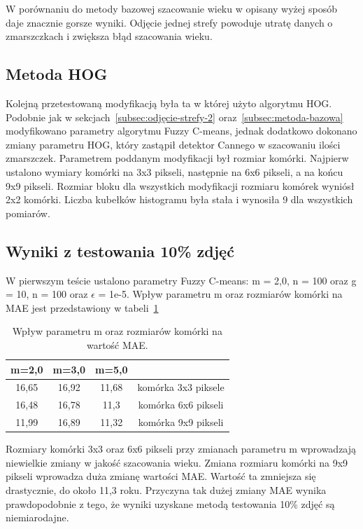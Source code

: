 \documentclass[a4paper,twoside,12pt]{book}
\begin{document}
    W porównaniu do metody bazowej szacowanie wieku w opisany wyżej sposób daje znacznie
    gorsze wyniki. Odjęcie jednej strefy powoduje utratę
    danych o zmarszczkach i zwiększa błąd szacowania wieku.

    \subsection{Metoda HOG}\label{subsec:metoda-hog}
    Kolejną przetestowaną modyfikacją była ta w której użyto algorytmu HOG.
    Podobnie jak w sekcjach~\ref{subsec:odjęcie-strefy-2} oraz~\ref{subsec:metoda-bazowa} modyfikowano parametry
    algorytmu Fuzzy C-means, jednak dodatkowo dokonano zmiany parametru HOG, który zastąpił detektor Cannego w
    szacowaniu ilości zmarszczek.
    Parametrem poddanym modyfikacji był
    rozmiar komórki. Najpierw ustalono wymiary komórki na 3x3 pikseli, następnie na 6x6 pikseli, a na końcu 9x9
    pikseli.
    Rozmiar bloku dla wszystkich modyfikacji rozmiaru komórek wyniósł
    2x2 komórki. Liczba kubełków histogramu była stała i wynosiła 9 dla wszystkich pomiarów.
    \subsection*{Wyniki z testowania 10\% zdjęć}
    W pierwszym teście ustalono parametry Fuzzy C-means: m = 2,0, n = 100 oraz g = 10, n = 100
    oraz $\epsilon$ = 1e-5.
    Wpływ parametru m oraz rozmiarów komórki na MAE jest przedstawiony w tabeli~\ref{tab.hog}
    \begin{table}[]
        \centering
        \caption{Wpływ parametru m oraz rozmiarów komórki na wartość MAE.}
        \begin{tabular}{|c|c|c|c|}
            \hline
            m=2,0 & m=3,0 & m=5,0 &                     \\ \hline
            16,65 & 16,92 & 11,68 & komórka 3x3 piksele \\ \hline
            16,48 & 16,78 & 11,3 & komórka 6x6 pikseli \\ \hline
            11,99 & 16,89 & 11,32 & komórka 9x9 pikseli \\ \hline
        \end{tabular}
        \label{tab.hog}
    \end{table}
    Rozmiary komórki 3x3 oraz 6x6 pikseli przy zmianach parametru m wprowadzają niewielkie zmiany w jakość
    szacowania wieku. Zmiana rozmiaru komórki na 9x9 pikseli wprowadza duża zmianę wartości MAE. Wartość ta
    zmniejsza się drastycznie, do około 11,3 roku. Przyczyna tak dużej zmiany MAE wynika prawdopodobnie z tego, że
    wyniki uzyskane metodą testowania 10\% zdjęć są niemiarodajne.
\end{document}
